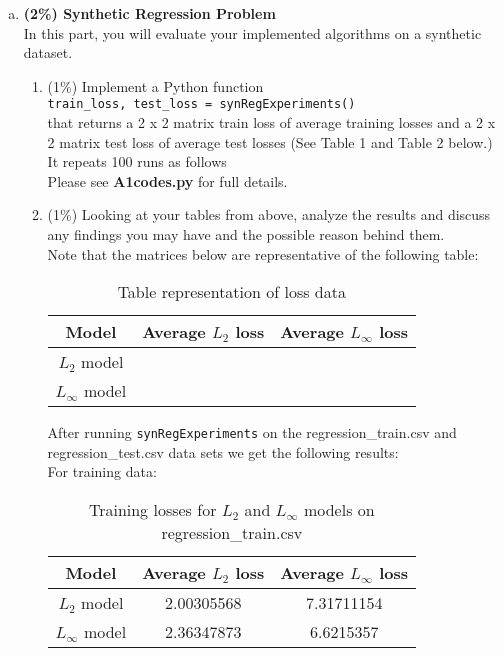 \documentclass[12pt]{article}
\newcounter{ques}
\newenvironment{question}{\stepcounter{ques}{\noindent\bf Question \arabic{ques}:}}{\vspace{5mm}}
\begin{document}
\begin{question}
\begin{enumerate}[(a)]
    \item \textbf{(2\%) Synthetic Regression Problem}  \\
    In this part, you will evaluate your implemented algorithms on a synthetic dataset.
    \begin{enumerate}[(c.1)]
      \item (1\%) Implement a Python function \\
      \texttt{train\_loss, test\_loss = synRegExperiments()} \\that returns a 2 x 2 matrix train loss of average training losses and a 2 x 2 matrix test loss of average test losses (See Table 1 and Table 2 below.) It repeats 100 runs as follows \\
      Please see \textbf{A1codes.py} for full details.
      \item (1\%) Looking at your tables from above, analyze the results and discuss any findings you may have and the possible reason behind them. \\
      Note that the matrices below are representative of the following table:
      \begin{table}[H]
        \centering
        \begin{tabular}{|c|c|c|}
          \hline
          Model & Average $L_2$ loss & Average $L_\infty$ loss \\ 
          \hline
          $L_2$ model &  &  \\ 
          $L_\infty$ model &  &  \\ 
          \hline
        \end{tabular}
        \caption{Table representation of loss data}
        \label{tab:basic_table}
      \end{table}
      After running \texttt{synRegExperiments} on the regression\_train.csv and regression\_test.csv data sets we get the following results: \\
      For training data:
      \begin{table}[H]
        \centering
        \begin{tabular}{|c|c|c|}
          \hline
          Model & Average $L_2$ loss & Average $L_\infty$ loss \\ 
          \hline
          $L_2$ model & 2.00305568 & 7.31711154 \\ 
          $L_\infty$ model & 2.36347873 & 6.6215357 \\ 
          \hline
        \end{tabular}
        \caption{Training losses for $L_2$ and $L_\infty$ models on regression\_train.csv}

\end{table}
\end{enumerate}
\end{enumerate}
\end{question}
\end{document}
